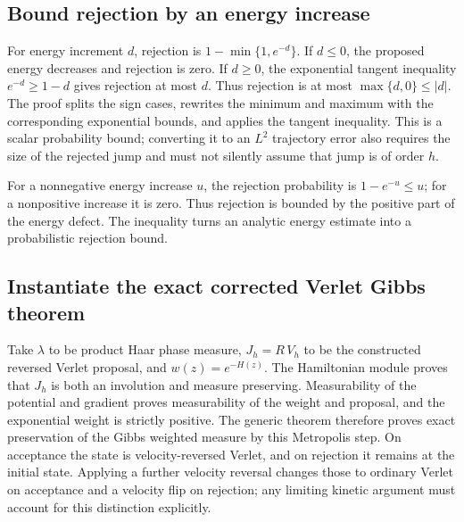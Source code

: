 \documentclass[11pt,a4paper]{report}
\begin{document}
\subsection{\texorpdfstring{Bound rejection by an energy increase}{Bound rejection by an energy increase}}
\label{report-step-KineticLangevin-HamiltonianMetropolis-lean-3}


For energy increment \(d\), rejection is \(1-\min\{1,e^{-d}\}\). If \(d\le0\), the proposed energy decreases and rejection is zero. If \(d\ge0\), the exponential tangent inequality \(e^{-d}\ge1-d\) gives rejection at most \(d\). Thus rejection is at most \(\max\{d,0\}\le|d|\). The proof splits the sign cases, rewrites the minimum and maximum with the corresponding exponential bounds, and applies the tangent inequality. This is a scalar probability bound; converting it to an \(L^{2}\) trajectory error also requires the size of the rejected jump and must not silently assume that jump is of order \(h\).



For a nonnegative energy increase \(u\), the rejection probability is \(1-e^{-u}\le u\); for a nonpositive increase it is zero. Thus rejection is bounded by the positive part of the energy defect. The inequality turns an analytic energy estimate into a probabilistic rejection bound.

\subsection{\texorpdfstring{Instantiate the exact corrected Verlet Gibbs theorem}{Instantiate the exact corrected Verlet Gibbs theorem}}
\label{report-step-KineticLangevin-HamiltonianMetropolis-lean-4}


Take \(\lambda\) to be product Haar phase measure, \(J_h=R\,V_h\) to be the constructed reversed Verlet proposal, and \(w(z)=e^{-H(z)}\). The Hamiltonian module proves that \(J_h\) is both an involution and measure preserving. Measurability of the potential and gradient proves measurability of the weight and proposal, and the exponential weight is strictly positive. The generic theorem therefore proves exact preservation of the Gibbs weighted measure by this Metropolis step. On acceptance the state is velocity-reversed Verlet, and on rejection it remains at the initial state. Applying a further velocity reversal changes those to ordinary Verlet on acceptance and a velocity flip on rejection; any limiting kinetic argument must account for this distinction explicitly.
\end{document}
